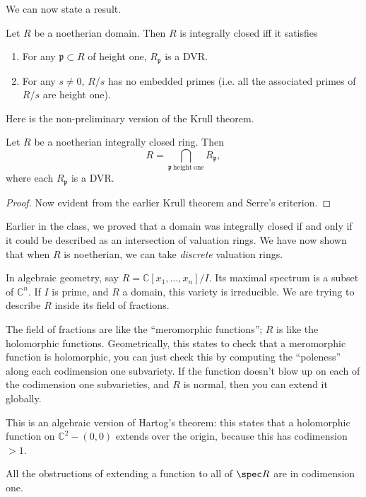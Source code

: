 We can now state a result.
\begin{theorem}[Serre] Let $R$ be a noetherian domain.  Then $R $ is integrally
closed iff it satisfies 
\begin{enumerate}
\item For any $\mathfrak{p} \subset R$ of height one, $R_{\mathfrak{p}}$ is a
DVR.
\item For any $s \neq 0$, $R/s$ has no embedded primes (i.e. all the
associated primes of $R/s$ are height one). 
\end{enumerate}
\end{theorem} 

Here is the non-preliminary version of the Krull theorem.
\begin{theorem}[Krull]
Let $R$ be a noetherian integrally closed ring. Then 
\[ R = \bigcap_{\mathfrak{p} \ \mathrm{height \ one}} R_{\mathfrak{p}},  \]
where each $R_{\mathfrak{p}}$ is a DVR.
\end{theorem} 

\begin{proof} 
Now evident from the earlier Krull theorem and Serre's criterion.
\end{proof} 
Earlier in the class, we proved that a domain was integrally closed if and only
if it could be described as an intersection of valuation rings. We have now
shown that when $R$ is noetherian, we can take \emph{discrete} valuation rings. 

\begin{remark} 
In algebraic geometry, say $R = \mathbb{C}[x_1, \dots, x_n]/I$.  Its maximal
spectrum is a subset of $\mathbb{C}^n$.  If $I$ is prime, and $R$ a domain, this variety is
irreducible.  We are trying to describe $R$ inside its field of fractions. 

The field of fractions are like the ``meromorphic functions''; $R$ is like the
holomorphic functions. Geometrically, this states to check that a meromorphic
function is holomorphic, you can just check this by computing the ``poleness''
along each codimension one subvariety. If the function doesn't blow up on each
of the codimension one subvarieties,  and $R$ is normal, then you can extend it
globally.

This is an algebraic version of Hartog's theorem: this states that a
holomorphic function on $\mathbb{C}^2 - (0,0)$ extends over the origin, because
this has codimension $>1$. 

All the obstructions of extending a function to all of $\spec R$ are in
codimension one. 
\end{remark} 

